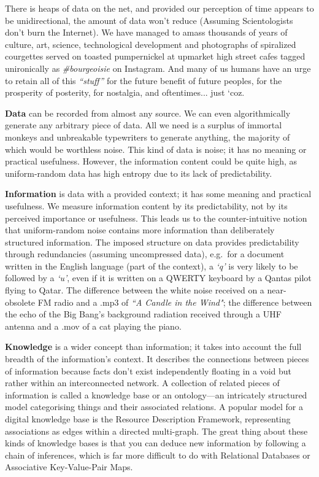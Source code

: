 There is heaps of data on the net, and provided our perception of time appears to be unidirectional, the amount of data won't reduce (Assuming Scientologists don't burn the Internet). We have managed to amass thousands of years of culture, art, science, technological development and photographs of spiralized courgettes served on toasted pumpernickel at upmarket high street cafes tagged unironically as \textit{\#bourgeoisie} on Instagram. And many of us humans have an urge to retain all of this \textit{``stuff''} for the future benefit of future peoples, for the prosperity of posterity, for nostalgia, and oftentimes... just `coz.

\textbf{Data} can be recorded from almost any source. We can even algorithmically generate any arbitrary piece of data. All we need is a surplus of immortal monkeys and unbreakable typewriters to generate anything, the majority of which would be worthless noise. This kind of data is noise; it has no meaning or practical usefulness. However, the information content could be quite high, as uniform-random data has high entropy due to its lack of predictability.

\textbf{Information} is data with a provided context; it has some meaning and practical usefulness. We measure information content by its predictability, not by its perceived importance or usefulness. This leads us to the counter-intuitive notion that uniform-random noise contains more information than deliberately structured information. The imposed structure on data provides predictability through redundancies (assuming uncompressed data), e.g.\ for a document written in the English language (part of the context), a \textit{`q'} is very likely to be followed by a \textit{`u'}, even if it is written on a QWERTY keyboard by a Qantas pilot flying to Qatar. The difference between the white noise received on a near-obsolete FM radio and a .mp3 of \textit{``A Candle in the Wind"}; the difference between the echo of the Big Bang's background radiation received through a UHF antenna and a .mov of a cat playing the piano.

\textbf{Knowledge} is a wider concept than information; it takes into account the full breadth of the information's context. It describes the connections between pieces of information because facts don't exist independently floating in a void but rather within an interconnected network. A collection of related pieces of information is called a knowledge base or an ontology—an intricately structured model categorising things and their associated relations. A popular model for a digital knowledge base is the Resource Description Framework, representing associations as edges within a directed multi-graph. The great thing about these kinds of knowledge bases is that you can deduce new information by following a chain of inferences, which is far more difficult to do with Relational Databases or Associative Key-Value-Pair Maps.

